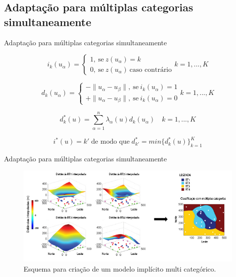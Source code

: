\documentclass[aspectratio=169]{beamer}
\begin{document}
\subsection{Adaptação para múltiplas categorias simultaneamente}

\begin{frame}{Adaptação para múltiplas categorias simultaneamente}

\begin{equation}
i_k(u_\alpha)=\begin{cases}
1,\:\textrm{se}\:z(u_\alpha)=k\\
0,\:\textrm{se}\:z(u_\alpha)\:\textrm{caso contrário}\end{cases} k=1,...,K
\label{eq_mult_ind}
\end{equation}

\begin{equation}
d_k(u_\alpha)=\begin{cases}
-\parallel u_\alpha-u_\beta\parallel,\:\textrm{se}\:i_k(u_\alpha)=1\\
+\parallel u_\alpha-u_\beta\parallel,\:\textrm{se}\:i_k(u_\alpha)=0\end{cases} k=1,...,K
\label{eq_mult_sg}
\end{equation}

\begin{equation}
d_k^*(u)=\sum\limits_{\alpha=1}^n \lambda_\alpha(u)d_k(u_\alpha)\quad k=1,...,K
\label{eq_mult_ok}
\end{equation}

\begin{equation}
i^*(u)=k'\;\text{de modo que}\;d_{k'}^*=min\{d_k^*(u)\}_{k=1}^K
\label{eq_mult_rt}
\end{equation}

\end{frame}

\begin{frame}{Adaptação para múltiplas categorias simultaneamente}
\begin{figure}[H]
	\caption{\label{mult_cat}Esquema para criação de um modelo implícito multi categórico.}
	\begin{center}
		\includegraphics[width=\textwidth]{capitulo_2/mult_cat_legenda.jpg}
	\end{center}
\end{figure}
\end{frame}
\end{document}
